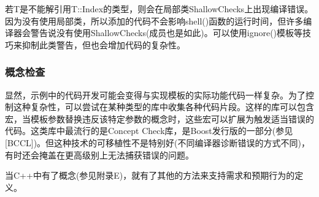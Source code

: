 若T是不能解引用T::Index的类型，则会在局部类ShallowChecks上出现编译错误。因为没有使用局部类，所以添加的代码不会影响shell()函数的运行时间，但许多编译器会警告说没有使用ShallowChecks(成员也是如此)。可以使用ignore()模板等技巧来抑制此类警告，但也会增加代码的复杂性。

\subsubsection{概念检查}

显然，示例中的代码开发可能会变得与实现模板的实际功能代码一样复杂。为了控制这种复杂性，可以尝试在某种类型的库中收集各种代码片段。这样的库可以包含宏，当模板参数替换违反该特定参数的概念时，这些宏可以扩展为触发适当错误的代码。这类库中最流行的是Concept Check库，是Boost发行版的一部分(参见[BCCL])。但这种技术的可移植性不是特别好(不同编译器诊断错误的方式不同)，有时还会掩盖在更高级别上无法捕获错误的问题。

当C++中有了概念(参见附录E)，就有了其他的方法来支持需求和预期行为的定义。






























